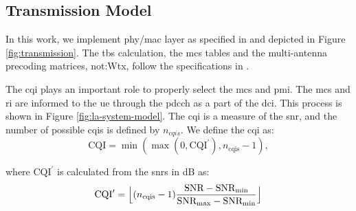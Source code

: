 \subsection{Transmission Model}

%
In this work, we implement \gls{phy}/\gls{mac} layer as specified in \cite{3gpp.38.212} and depicted in Figure \ref{fig:transmission}.
%
%
The \gls{tbs} calculation, the \gls{mcs} tables and the multi-antenna precoding matrices, \gls{not:Wtx}, follow the specifications in \cite{3gpp.38.214}.
%


The \gls{cqi} plays an important role to properly select the \gls{mcs} and \gls{pmi}.
%
The \gls{mcs} and \gls{ri} are informed to the \gls{ue} through the \gls{pdcch} as a part of the \gls{dci}. This process is shown in Figure \ref{fig:la-system-model}.
%
The \gls{cqi} is a measure of the \gls{snr}, and the number of possible \gls{cqi}s is defined by $n_{cqis}$. We define the \gls{cqi} as:
\begin{equation}\label{eq:cqi}
\textrm{CQI} = \min{
	(\max {(0, \textrm{CQI}^{\prime} ) }, n_{\text{cqis}} - 1)},
\end{equation}

\noindent where $\textrm{CQI}^{\prime}$ is calculated from the \gls{snr}s in dB as:
\begin{equation}\label{eq:cqi_prime}
\textrm{CQI}^{\prime} = \floor[\Big]{(n_{\text{cqis}}-1)\frac{\textrm{SNR} - \textrm{SNR}_{\text{min}}}{\textrm{SNR}_{\text{max}}-\textrm{SNR}_{\text{min}}}}
\end{equation}



